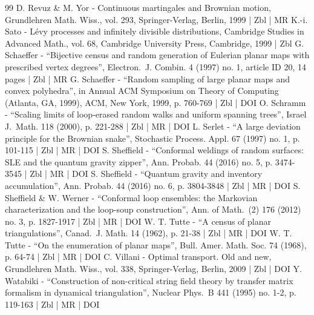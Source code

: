 \begin{thebibliography}{99}
D. Revuz \& M. Yor - Continuous martingales and Brownian motion, Grundlehren Math. Wiss., vol. 293, Springer-Verlag, Berlin, 1999 | Zbl | MR
K.-i. Sato - Lévy processes and infinitely divisible distributions, Cambridge Studies in Advanced Math., vol. 68, Cambridge University Press, Cambridge, 1999 | Zbl
G. Schaeffer - “Bijective census and random generation of Eulerian planar maps with prescribed vertex degrees”, Electron. J. Combin. 4 (1997) no. 1, article ID 20, 14 pages | Zbl | MR
G. Schaeffer - “Random sampling of large planar maps and convex polyhedra”, in Annual ACM Symposium on Theory of Computing (Atlanta, GA, 1999), ACM, New York, 1999, p. 760-769 | Zbl | DOI
O. Schramm - “Scaling limits of loop-erased random walks and uniform spanning trees”, Israel J. Math. 118 (2000), p. 221-288 | Zbl | MR | DOI
L. Serlet - “A large deviation principle for the Brownian snake”, Stochastic Process. Appl. 67 (1997) no. 1, p. 101-115 | Zbl | MR | DOI
S. Sheffield - “Conformal weldings of random surfaces: SLE and the quantum gravity zipper”, Ann. Probab. 44 (2016) no. 5, p. 3474-3545 | Zbl | MR | DOI
S. Sheffield - “Quantum gravity and inventory accumulation”, Ann. Probab. 44 (2016) no. 6, p. 3804-3848 | Zbl | MR | DOI
S. Sheffield \& W. Werner - “Conformal loop ensembles: the Markovian characterization and the loop-soup construction”, Ann. of Math. (2) 176 (2012) no. 3, p. 1827-1917 | Zbl | MR | DOI
W. T. Tutte - “A census of planar triangulations”, Canad. J. Math. 14 (1962), p. 21-38 | Zbl | MR | DOI
W. T. Tutte - “On the enumeration of planar maps”, Bull. Amer. Math. Soc. 74 (1968), p. 64-74 | Zbl | MR | DOI
C. Villani - Optimal transport. Old and new, Grundlehren Math. Wiss., vol. 338, Springer-Verlag, Berlin, 2009 | Zbl | DOI
Y. Watabiki - “Construction of non-critical string field theory by transfer matrix formalism in dynamical triangulation”, Nuclear Phys. B 441 (1995) no. 1-2, p. 119-163 | Zbl | MR | DOI
\end{thebibliography}
